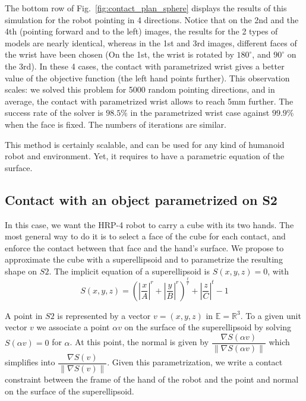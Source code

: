 The bottom row of Fig.~\ref{fig:contact_plan_sphere} displays the results of this simulation for the robot pointing in 4 directions.
Notice that on the 2nd and the 4th (pointing forward and to the left) images, the results for the 2 types of models are nearly identical, whereas in the 1st and 3rd images, different faces of the wrist have been chosen (On the 1st, the wrist is rotated by $180^{\circ}$, and $90^{\circ}$ on the 3rd).
In these 4 cases, the contact with parametrized wrist gives a better value of the objective function (the left hand points further).
This observation scales:
we solved this problem for 5000 random pointing directions, and in average, the contact with parametrized wrist allows to reach 5mm further.
The success rate of the solver is $98.5\%$ in the parametrized wrist case against $99.9\%$ when the face is fixed.
The numbers of iterations are similar.

This method is certainly scalable, and can be used for any kind of humanoid robot and environment.
Yet, it requires to have a parametric equation of the surface.

\subsection{Contact with an object parametrized on S2}

In this case, we want the HRP-4 robot to carry a cube with its two hands.
The most general way to do it is to select a face of the cube for each contact, and enforce the contact between that face and the hand's surface.
We propose to approximate the cube with a superellipsoid and to parametrize the resulting shape on $S2$.
The implicit equation of a superellipsoid is $S(x,y,z) = 0$, with
\begin{equation}
  S(x,y,z) = {\left( \left|\frac{x}{A}\right|^r + \left|\frac{y}{B}\right|^r\right)}^\frac{t}{r} + \left|\frac{z}{C}\right|^t - 1
  \label{eq:super_ellipsoid}
\end{equation}

A point in $S2$ is represented by a vector $v=(x,y,z)$ in $\mathbb{E} = \mathbb{R}^3$.
To a given unit vector $v$ we associate a point $\alpha v$ on the surface of the superellipsoid by solving $S(\alpha v) = 0$ for $\alpha$.
At this point, the normal is given by $\dfrac{\nabla S(\alpha v)}{\left\|\nabla S(\alpha v)\right\|}$ which simplifies into $\dfrac{\nabla S(v)}{\left\|\nabla S(v)\right\|}$.
Given this parametrization, we write a contact constraint between the frame of the hand of the robot and the point and normal on the surface of the superellipsoid.

